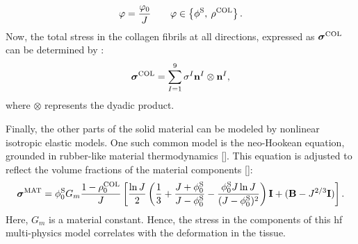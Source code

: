 \documentclass[12pt,a4paper]{report}
\begin{document}
%
\begin{equation}
    \label{continuity}
    \varphi = \frac{\varphi_0}{J} 
    \qquad 
    \varphi \in \left \{\phi^{\rm S}, \: \rho^{\rm COL} \right \}.
\end{equation}
%
Now, the total stress in the collagen fibrils at all directions, expressed as $\boldsymbol{\sigma}^{\rm COL}$ can be determined by \cite{wilson2004a}:
%
\begin{equation}\label{eq-fibril_stress}
    \boldsymbol{\sigma}^{\rm COL} = \sum_{I=1}^9 \sigma^I \mathbf{n}^I \otimes \mathbf{n}^I,
\end{equation}
%
where $\otimes$ represents the dyadic product.

Finally, the other parts of the solid material can be modeled by nonlinear isotropic elastic models. One such common model is the neo-Hookean equation, grounded in rubber-like material thermodynamics [\cite{kim2012}]. This equation is adjusted to reflect the volume fractions of the material components [\cite{wilson2007,sajjadinia2019}]:
%
\begin{equation}\label{eq-non_fibrillar}
    \boldsymbol{\sigma}^{\rm MAT} = 
    \phi^{\rm S}_0 G_m \frac{1 - \rho_0^{\rm COL}}{J} \left[\frac{\ln{J}}{2} 
    \left( \frac{1}{3} + \frac{J + \phi^{\rm S}_0}{J - \phi^{\rm S}_0} - \frac{\phi^{\rm S}_0 J\ln{J}}{( J - \phi^{\rm S}_0)^2} \right) \mathbf{I} 
    + (\mathbf{B} - J^{2/3}\mathbf{I}) \right].
\end{equation}
%
Here, \( G_m \) is a material constant. Hence, the stress in the components of this \ac{hf} multi-physics model correlates with the deformation in the tissue.
\end{document}
